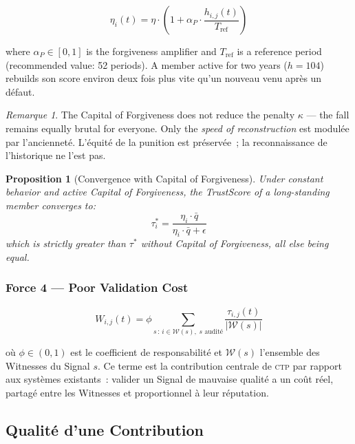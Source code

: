 \documentclass[12pt,a4paper]{article}
\theoremstyle{definition}
\theoremstyle{plain}
\newtheorem{proposition}{Proposition}[section]
\theoremstyle{remark}
\newtheorem{remarque}{Remarque}[section]
\newcommand{\CTP}{\textsc{ctp}}
\newcommand{\trustscore}{\tau}
\newcommand{\1}{\mathbf{1}}
\begin{document}
\begin{equation}
\boxed{\eta_i(t) = \eta \cdot \left(1 + \alpha_P \cdot
\frac{h_{i,j}(t)}{T_{\text{ref}}}\right)}
\label{eq:pardon}
\end{equation}

where $\alpha_P \in [0,1]$ is the forgiveness amplifier and
$T_{\text{ref}}$ is a reference period (recommended value:
52 periods). A member active for two years ($h = 104$) rebuilds
son score environ deux fois plus vite qu'un nouveau venu après un défaut.

\begin{remarque}
The Capital of Forgiveness does not reduce the penalty $\kappa$ --- the fall
remains equally brutal for everyone. Only the \emph{speed of
reconstruction} est modulée par l'ancienneté. L'équité de la punition
est préservée~; la reconnaissance de l'historique ne l'est pas.
\end{remarque}

\begin{proposition}[Convergence with Capital of Forgiveness]
Under constant behavior and active Capital of Forgiveness, the TrustScore
of a long-standing member converges to:
$$\trustscore_i^* = \frac{\eta_i \cdot \bar{q}}{\eta_i \cdot \bar{q} + \epsilon}$$
which is strictly greater than $\trustscore^*$ without Capital of Forgiveness,
all else being equal.
\end{proposition}

\subsubsection{Force 4 --- Poor Validation Cost}

\begin{equation}
W_{i,j}(t) = \phi \sum_{s \,:\, i \in \mathcal{W}(s),\; s \text{ audité}}
\frac{\trustscore_{i,j}(t)}{|\mathcal{W}(s)|}
\label{eq:witness_cost}
\end{equation}

où $\phi \in (0,1)$ est le coefficient de responsabilité et $\mathcal{W}(s)$
l'ensemble des Witnesses du Signal $s$. Ce terme est la contribution centrale
de \CTP{} par rapport aux systèmes existants~: valider un Signal de mauvaise
qualité a un coût réel, partagé entre les Witnesses et proportionnel à leur
réputation.

\subsection{Qualité d'une Contribution}
\end{document}
